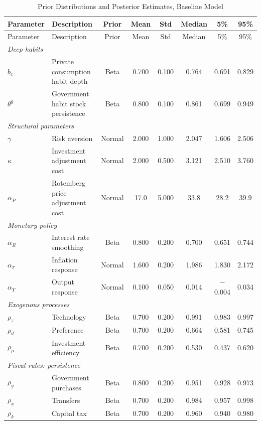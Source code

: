 {\footnotesize\setlength{\tabcolsep}{3.5pt}
\begin{longtable}{llcccccc}
\caption{Prior Distributions and Posterior Estimates, Baseline Model}\label{tab:priors} \\
\hline\hline
Parameter & Description & Prior & Mean & Std & Median & 5\% & 95\% \\
\hline
\endfirsthead
\hline\hline
Parameter & Description & Prior & Mean & Std & Median & 5\% & 95\% \\
\hline
\endhead
\multicolumn{8}{l}{\textit{Deep habits}} \\
$b_c$ & Private consumption habit depth & Beta & 0.700 & 0.100 & 0.764 & 0.691 & 0.829 \\
$\theta^g$ & Government habit stock persistence & Beta & 0.800 & 0.100 & 0.861 & 0.699 & 0.949 \\
\multicolumn{8}{l}{\textit{Structural parameters}} \\
$\gamma$ & Risk aversion & Normal & 2.000 & 1.000 & 2.047 & 1.606 & 2.506 \\
$\kappa$ & Investment adjustment cost & Normal & 2.000 & 0.500 & 3.121 & 2.510 & 3.760 \\
$\alpha_P$ & Rotemberg price adjustment cost & Normal & 17.0 & 5.000 & 33.8 & 28.2 & 39.9 \\
\multicolumn{8}{l}{\textit{Monetary policy}} \\
$\alpha_R$ & Interest rate smoothing & Beta & 0.800 & 0.200 & 0.700 & 0.651 & 0.744 \\
$\alpha_\pi$ & Inflation response & Normal & 1.600 & 0.200 & 1.986 & 1.830 & 2.172 \\
$\alpha_Y$ & Output response & Normal & 0.100 & 0.050 & 0.014 & $-$0.004 & 0.034 \\
\multicolumn{8}{l}{\textit{Exogenous processes}} \\
$\rho_z$ & Technology & Beta & 0.700 & 0.200 & 0.991 & 0.983 & 0.997 \\
$\rho_d$ & Preference & Beta & 0.700 & 0.200 & 0.664 & 0.581 & 0.745 \\
$\rho_\mu$ & Investment efficiency & Beta & 0.700 & 0.200 & 0.530 & 0.437 & 0.620 \\
\multicolumn{8}{l}{\textit{Fiscal rules: persistence}} \\
$\rho_g$ & Government purchases & Beta & 0.800 & 0.200 & 0.951 & 0.928 & 0.973 \\
$\rho_x$ & Transfers & Beta & 0.700 & 0.200 & 0.984 & 0.957 & 0.998 \\
$\rho_k$ & Capital tax & Beta & 0.700 & 0.200 & 0.960 & 0.940 & 0.980 \\

\end{longtable}}
